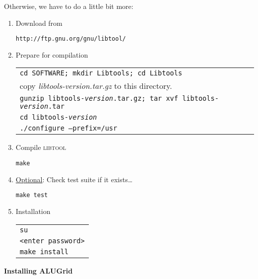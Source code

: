 \documentclass[a4paper,12pt]{article}
\begin{document}
\medskip
Otherwise, we have to do a little bit more:
\begin{enumerate}
  \item Download from
   \begin{center}
     \texttt{http://ftp.gnu.org/gnu/libtool/}
   \end{center}
 \item Prepare for compilation 
 \begin{center}
      \begin{tabular}{l}
        \texttt{cd SOFTWARE; mkdir Libtools; cd Libtools}\\
        copy \textit{libtools-version.tar.gz} to this directory.\\
        \texttt{gunzip libtools-\textit{version}.tar.gz; tar xvf
          libtools-\textit{version}.tar}\\
          \texttt{cd libtools-\textit{version}}\\
      \texttt{./configure --prefix=/usr}
   \end{tabular}
      \end{center}
\item Compile \textsc{libtool}
\begin{center}
     \texttt{make}
   \end{center}
\item \underline{Optional}: Check test suite if it exists\ldots 
 \begin{center}
     \texttt{make test}
   \end{center}
  \item Installation
 \begin{center}
   \begin{tabular}{l}
     \texttt{su}\\
      \texttt{<enter password>}\\
       \texttt{make install}
     \end{tabular}
   \end{center}
\end{enumerate}

\medskip
\begin{center}
 \large {\textbf{\textsf{Installing ALUGrid}}}
\end{center}
\end{document}

